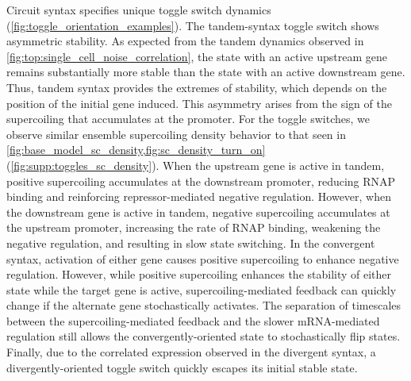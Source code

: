 \documentclass[11pt]{article}
\begin{document}
Circuit syntax specifies unique toggle switch dynamics (\cref{fig:toggle_orientation_examples}). The tandem-syntax toggle switch shows asymmetric stability. As expected from the tandem dynamics observed in \cref{fig:top:single_cell_noise_correlation}, the state with an active upstream gene remains substantially more stable than the state with an active downstream gene. Thus, tandem syntax provides the extremes of stability, which depends on the position of the initial gene induced.  This asymmetry arises from the sign of the supercoiling that accumulates at the promoter. For the toggle switches, we observe similar ensemble supercoiling density behavior to that seen in \cref{fig:base_model_sc_density,fig:sc_density_turn_on} (\cref{fig:supp:toggles_sc_density}).
When the upstream gene is active in tandem, positive supercoiling accumulates at the downstream promoter, reducing RNAP binding and reinforcing repressor-mediated negative regulation. However, when the downstream gene is active in tandem, negative supercoiling accumulates at the upstream promoter, increasing the rate of RNAP binding, weakening the negative regulation, and resulting in slow state switching. In the convergent syntax, activation of either gene causes positive supercoiling to enhance negative regulation. However, while positive supercoiling enhances the stability of either state while the target gene is active, supercoiling-mediated feedback can quickly change if the alternate gene stochastically activates. The separation of timescales between the supercoiling-mediated feedback and the slower mRNA-mediated regulation still allows the convergently-oriented state to stochastically flip states. Finally, due to the correlated expression observed in the divergent syntax, a divergently-oriented toggle switch quickly escapes its initial stable state.
\end{document}
